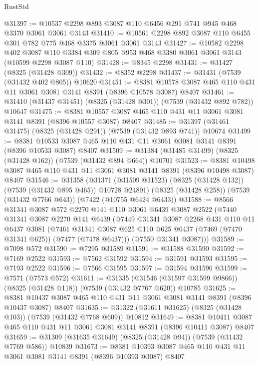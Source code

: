 \begin{lexlean}{RustStd}
\begin{coremodule}
@31397 := @10537 @2298 @893 @3087 @110 @6456 @291 @741 @945 @468 @3370 @3061 @3061 @3143
@31410 := @10561 @2298 @892 @3087 @110 @6455 @301 @782 @775 @468 @3375 @3061 @3061 @3143
@31427 := @10582
    @2298
    @402
    @3087
    @110
    @3384
    @309
    @805
    @953
    @468
    @3380
    @3061
    @3061
    @3143
    (@10599 @2298 @3087 @110)
@31428 := @8345 @2298
@31431 := @31427 (@8325 (@31428 @309))
@31432 := @8352 @2298
@31437 := @31431 (@7539 (@31432 @402 @805)) @10620
@31451 := @8381 @10578 @3087 @465 @110 @431 @11 @3061 @3081 @3141 @8391 (@8396 @10578 @3087) @8407
@31461 := @31410 (@31437 @31451) (@8325 (@31428 @301)) (@7539 (@31432 @892 @782)) @10647
@31475 := @8381 @10557 @3087 @465 @110 @431 @11 @3061 @3081 @3141 @8391 (@8396 @10557 @3087) @8407
@31485 := @31397 (@31461 @31475) (@8325 (@31428 @291)) (@7539 (@31432 @893 @741)) @10674
@31499 := @8381 @10533 @3087 @465 @110 @431 @11 @3061 @3081 @3141 @8391 (@8396 @10533 @3087) @8407
@31509 := @31384 (@31485 @31499) (@8325 (@31428 @162)) (@7539 (@31432 @894 @664)) @10701
@31523 := @8381 @10498 @3087 @465 @110 @431 @11 @3061 @3081 @3141 @8391 (@8396 @10498 @3087) @8407
@31546 := @31358
    (@31371 (@31509 @31523) (@8325 (@31428 @132)) (@7539 (@31432 @895 @465)) @10728 @24891)
    (@8325 (@31428 @258))
    (@7539 (@31432 @7766 @643))
    (@7422 (@10755 @6424 @6433))
@31588 := @8566
    @31341
    @3087
    @572
    @2270
    @141
    @110
    @3061
    @6439
    @3087
    @2522
    (@7440
      @31341
      @3087
      @2270
      @141
      @6439
      (@7449
        @31341
        @3087
        @2268
        @431
        @110
        @11
        @6437
        @3081
        (@7461 @31341 @3087 @625 @110 @625 @6437 (@7469 (@7470 @31341 @625)) (@7477 (@7478 @6437)))
        (@7550 @31341 @3087)))
@31589 := @7098 @572
@31590 := @7295 @31589
@31591 := @31588 @31590
@31592 := @7169 @2522
@31593 := @7562 @31592
@31594 := @31591 @31593
@31595 := @7193 @2522
@31596 := @7566 @31595
@31597 := @31594 @31596
@31599 := @7571 (@7573 @572)
@31611 := @31335
    (@31546 (@31597 @31599 @9866))
    (@8325 (@31428 @118))
    (@7539 (@31432 @7767 @620))
    @10785
@31625 := @8381 @10437 @3087 @465 @110 @431 @11 @3061 @3081 @3141 @8391 (@8396 @10437 @3087) @8407
@31635 := @31322 (@31611 @31625) (@8325 (@31428 @103)) (@7539 (@31432 @7768 @609)) @10812
@31649 := @8381 @10411 @3087 @465 @110 @431 @11 @3061 @3081 @3141 @8391 (@8396 @10411 @3087) @8407
@31659 := @31309 (@31635 @31649) (@8325 (@31428 @94)) (@7539 (@31432 @7769 @586)) @10839
@31673 := @8381 @10393 @3087 @465 @110 @431 @11 @3061 @3081 @3141 @8391 (@8396 @10393 @3087) @8407

\end{coremodule}
\end{lexlean}
